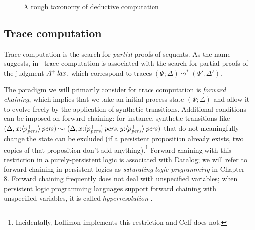 \begin{figure}
\caption{A rough taxonomy of deductive computation}
\label{fig:computation-taxonomy}
\end{figure}

\subsection{Trace computation}
\label{sec:framework-logicprog-trace}


Trace computation is the search for {\it partial} proofs of
sequents. As the name suggests, in \sls~trace computation is
associated with the search for partial proofs of the judgment
${A^+}\,{{\it lax}}$, which correspond to traces $(\Psi;
\Delta) \leadsto^* (\Psi'; \Delta')$. 

The paradigm we will primarily consider for trace computation is {\it
  forward chaining}, which implies that we take an initial process
state $(\Psi;\Delta)$ and allow it to evolve freely by the application
of synthetic transitions. Additional conditions can be imposed on
forward chaining: for instance, synthetic transitions like $(\Delta,
x{:}{\langle {p^+_{\it pers}} \rangle}\,{{\it pers}}) \leadsto (\Delta,
x{:}{\langle {p^+_{\it pers}} \rangle}\,{{\it pers}}, y{:}{\langle {p^+_{\it pers}} \rangle}\,{{\it pers}})$ that
do not meaningfully change the state can be excluded (if a persistent
proposition already exists, two copies of that proposition don't add
anything).\footnote{Incidentally, Lollimon implements this restriction
  and Celf does not.} Forward chaining with this restriction in a
purely-persistent logic is associated with Datalog; we will refer to
forward chaining in persistent logics as {\it saturating logic
  programming} in Chapter 8. Forward chaining
frequently does not deal with unspecified variables; when persistent
logic programming languages support forward chaining with unspecified
variables, it is called {\it hyperresolution}
\cite{fermuller01resolution}.

